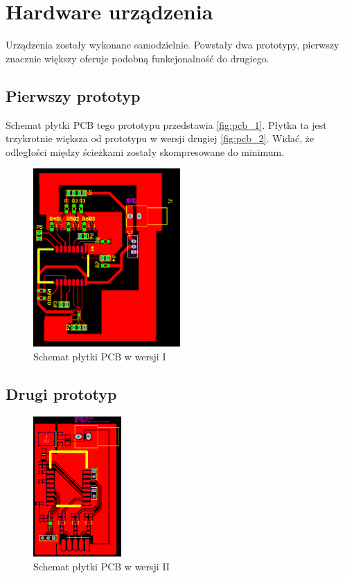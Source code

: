 \section{Hardware urządzenia}
\label{sec:hardware}
Urządzenia zostały wykonane samodzielnie. Powstały dwa prototypy, pierwszy znacznie większy oferuje podobną funkcjonalność do drugiego. 

\subsection{Pierwszy prototyp}

Schemat płytki PCB tego prototypu przedstawia \autoref{fig:pcb_1}. Płytka ta jest trzykrotnie większa od prototypu w wersji drugiej \autoref{fig:pcb_2}. Widać, że odległości między ścieżkami zostały skompresowane do minimum. 

\begin{figure}[!htbp]
	\centering
	\includegraphics[width=0.5\textwidth]{images/fig02-PCBv1.png}
	\caption[Schemat płytki PCB v1.]{Schemat płytki PCB w wersji I}
	\label{fig:pcb_1}
\end{figure}


\subsection{Drugi prototyp}

\begin{figure}[!htbp]
	\centering
	\includegraphics[width=0.3\textwidth]{images/fig03-PCBv2.png}
	\caption[Schemat płytki PCB v2.]{Schemat płytki PCB w wersji II}
	\label{fig:pcb_2}
\end{figure}

